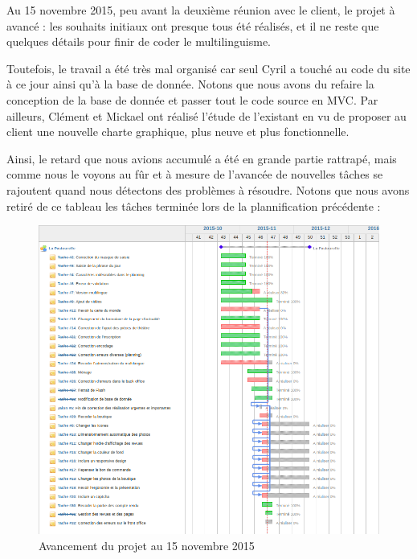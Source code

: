 \documentclass[11pt]{report}
\begin{document}
\par Au 15 novembre 2015, peu avant la deuxième réunion avec le client, le
projet à avancé : les souhaits initiaux ont presque tous été réalisés, et il ne reste que
quelques détails pour finir de coder le multilinguisme. \\
\par Toutefois, le travail a été très mal organisé car seul Cyril a touché au
code du site à ce jour ainsi qu'à la base de donnée. Notons que nous avons du
refaire la conception de la base de donnée et passer tout le code source en MVC. Par
ailleurs, Clément et Mickael ont réalisé l'étude de l'existant en vu de proposer
au client une nouvelle charte graphique, plus neuve et plus fonctionnelle. \\
\par Ainsi, le retard que nous avions accumulé a été en grande partie rattrapé,
mais comme nous le voyons au fûr et à mesure de l'avancée de nouvelles tâches se
rajoutent quand nous détectons des problèmes à résoudre. Notons que nous avons
retiré de ce tableau les tâches terminée lors de la plannification précédente :

\begin{landscape}
\begin{figure}[t]
    \caption{Avancement du projet au 15 novembre 2015}
   \includegraphics[scale=0.5]{include/gantt15-11.png}
\end{figure}
\end{landscape}
\end{document}
